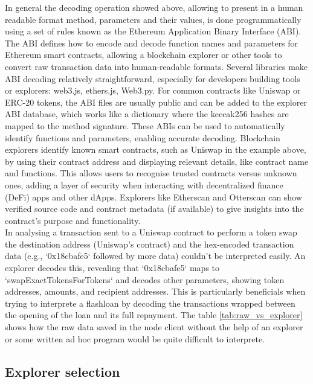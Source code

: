 \documentclass[11pt,a4paper,titlepage]{scrartcl}
\begin{document}
In general the decoding operation showed above, allowing to present in a human readable format method, parameters and their values,  is done programmatically using a set of rules known as the Ethereum Application Binary Interface (ABI). The ABI defines how to encode and decode function names and parameters for Ethereum smart contracts, allowing a blockchain explorer or other tools to convert raw transaction data into human-readable formats. Several libraries make ABI decoding relatively straightforward, especially for developers building tools or explorers:  web3.js,  ethers.js, Web3.py.
For common contracts like Uniswap or ERC-20 tokens, the ABI files are usually public and can be added to the explorer ABI database, which works like a dictionary where the keccak256 hashes are mapped to the method signature. These ABIs can be used to automatically identify functions and parameters, enabling accurate decoding. Blockchain explorers identify known smart contracts, such as Uniswap in the example above, by using their contract address and displaying relevant details, like contract name and functions. This allows users to recognise trusted contracts versus unknown ones, adding a layer of security when interacting with decentralized finance (DeFi) apps and other dApps.
Explorers like Etherscan and Otterscan can show verified source code and contract metadata (if available) to give insights into the contract’s purpose and functionality.\\
In analysing a transaction sent to a Uniswap contract to perform a token swap the destination address (Uniswap’s contract) and the hex-encoded transaction data (e.g., `0x18cbafe5` followed by more data) couldn’t be interpreted easily. An explorer decodes this, revealing that `0x18cbafe5` maps to `swapExactTokensForTokens` and decodes other parameters, showing token addresses, amounts, and recipient addresses. 
This is particularly beneficials when trying to interprete a flashloan by decoding  the  transactions wrapped between the opening of the loan and its full repayment. The table  \ref{tab:raw_vs_explorer}  shows how the raw data saved in the node client without the help of an explorer or some written ad hoc program would be quite difficult to interprete.




\subsection{Explorer selection}
\end{document}
